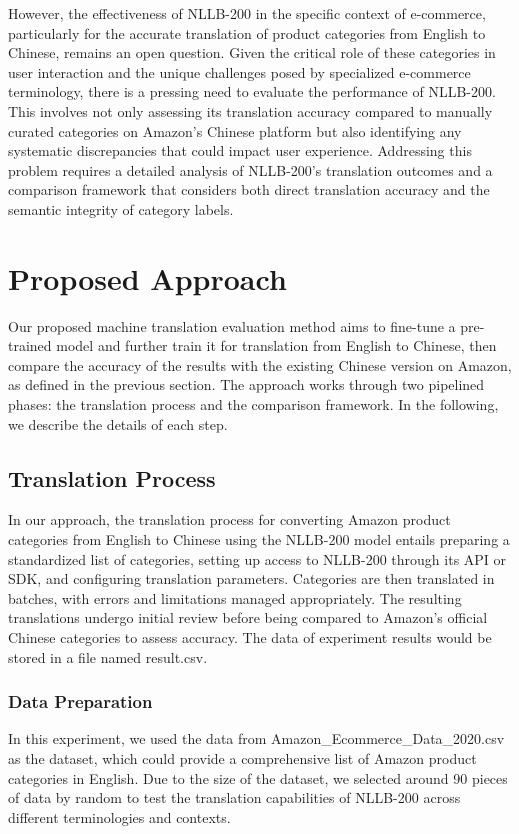 \documentclass[sigconf]{acmart}
\begin{document}
However, the effectiveness of NLLB-200 in the specific context of e-commerce, particularly for the accurate translation of product categories from English to Chinese, remains an open question. Given the critical role of these categories in user interaction and the unique challenges posed by specialized e-commerce terminology, there is a pressing need to evaluate the performance of NLLB-200. This involves not only assessing its translation accuracy compared to manually curated categories on Amazon's Chinese platform but also identifying any systematic discrepancies that could impact user experience. Addressing this problem requires a detailed analysis of NLLB-200's translation outcomes and a comparison framework that considers both direct translation accuracy and the semantic integrity of category labels.

\section{Proposed Approach}\label{approach}
Our proposed machine translation evaluation method aims to fine-tune a pre-trained model and further train it for translation from English to Chinese, then compare the accuracy of the results with the existing Chinese version on Amazon, as defined in the previous section. The approach works through two pipelined phases: the translation process and the comparison framework. In the following, we describe the details of each step.

\subsection{Translation Process}
In our approach, the translation process for converting Amazon product categories from English to Chinese using the NLLB-200 model entails preparing a standardized list of categories, setting up access to NLLB-200 through its API or SDK, and configuring translation parameters. Categories are then translated in batches, with errors and limitations managed appropriately. The resulting translations undergo initial review before being compared to Amazon's official Chinese categories to assess accuracy. The data of experiment results would be stored in a file named result.csv.


\subsubsection{Data Preparation}
In this experiment, we used the data from Amazon\_Ecommerce\_Data\_2020.csv as the dataset, which could provide a comprehensive list of Amazon product categories in English. Due to the size of the dataset, we selected around 90 pieces of data by random to test the translation capabilities of NLLB-200 across different terminologies and contexts. 
\end{document}

